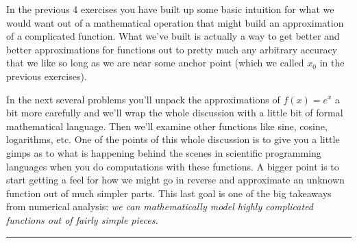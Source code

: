 \documentclass[
]{book}
\theoremstyle{definition}
\theoremstyle{definition}
\theoremstyle{definition}
\theoremstyle{remark}
\begin{document}
In the previous 4 exercises you have built up some basic intuition for what we would want out of a mathematical operation that might build an approximation of a complicated function. What we've built is actually a way to get better and better approximations for functions out to pretty much any arbitrary accuracy that we like so long as we are near some anchor point (which we called \(x_0\) in the previous exercises).

In the next several problems you'll unpack the approximations of \(f(x) = e^x\) a bit more carefully and we'll wrap the whole discussion with a little bit of formal mathematical language. Then we'll examine other functions like sine, cosine, logarithms, etc. One of the points of this whole discussion is to give you a little gimps as to what is happening behind the scenes in scientific programming languages when you do computations with these functions. A bigger point is to start getting a feel for how we might go in reverse and approximate an unknown function out of much simpler parts. This last goal is one of the big takeaways from numerical analysis: \emph{we can mathematically model highly complicated functions out of fairly simple pieces.}

\begin{center}\rule{0.5\linewidth}{0.5pt}\end{center}
\end{document}
